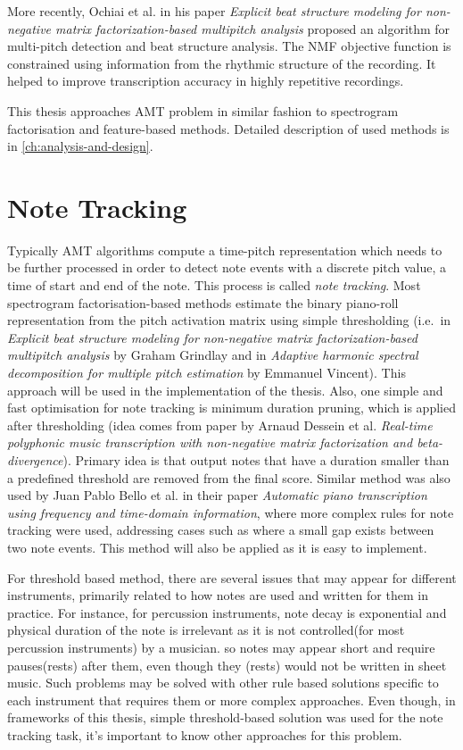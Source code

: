 More recently, Ochiai et al. in his paper \textit{Explicit beat structure modeling for non-negative matrix
factorization-based multipitch analysis}\cite{ochiai2012explicit} proposed an algorithm for multi-pitch detection and
beat structure analysis. The \ac{NMF} objective function is constrained using information from the rhythmic structure of
the recording. It helped to improve transcription accuracy in highly repetitive recordings.

This thesis approaches \ac{AMT} problem in similar fashion to spectrogram factorisation and feature-based methods.
Detailed description of used methods is in \cref{ch:analysis-and-design}.

\section{Note Tracking}\label{sec:note-tracking}

Typically \ac{AMT} algorithms compute a time-pitch representation which needs to be further processed in order to detect
note events with a discrete pitch value, a time of start and end of the note. This process is called \textit{note
tracking}. Most spectrogram factorisation-based methods estimate the binary piano-roll representation from the pitch
activation matrix using simple thresholding (i.e.\ in \textit{Explicit beat structure modeling for non-negative matrix
factorization-based multipitch analysis}\cite{grindlay2011transcribing} by Graham Grindlay and in \textit{Adaptive
harmonic spectral decomposition for multiple pitch estimation}\cite{vincent2009adaptive} by Emmanuel Vincent). This
approach will be used in the implementation of the thesis. Also, one simple and fast optimisation for note tracking is
minimum duration pruning, which is applied after thresholding (idea comes from paper by Arnaud Dessein et al.
\textit{Real-time polyphonic music transcription with non-negative matrix factorization and beta-divergence}\cite{dessein2010real}).
Primary idea is that output notes that have a duration smaller than a predefined threshold are removed from the final
score. Similar method was also used by Juan Pablo Bello et al. in their paper \textit{Automatic piano transcription
using frequency and time-domain information}\cite{bello2006automatic}, where more complex rules for note tracking were
used, addressing cases such as where a small gap exists between two note events. This method will also be applied as it
is easy to implement.

For threshold based method, there are several issues that may appear for different instruments, primarily related to how
notes are used and written for them in practice. For instance, for percussion instruments, note decay is exponential and
physical duration of the note is irrelevant as it is not controlled(for most percussion instruments) by a musician. so
notes may appear short and require pauses(rests) after them, even though they (rests) would not be written in sheet
music. Such problems may be solved with other rule based solutions specific to each instrument that requires them or
more complex approaches. Even though, in frameworks of this thesis, simple threshold-based solution was used for
the note tracking task, it's important to know other approaches for this problem.


